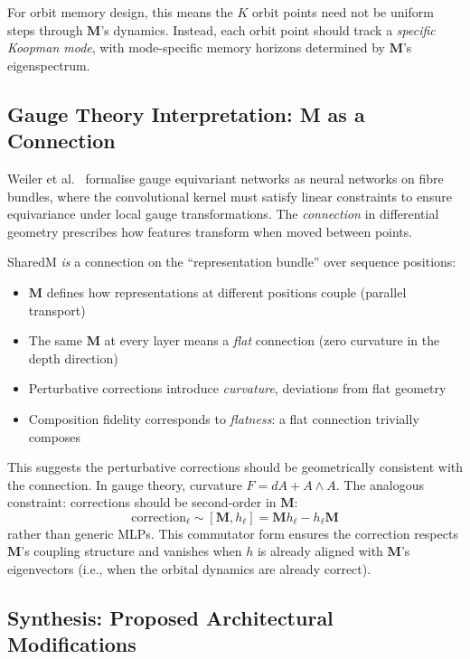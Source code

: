 \documentclass[11pt, a4paper]{article}
\newcommand{\M}{\mathbf{M}}
\theoremstyle{plain}
\theoremstyle{remark}
\begin{document}
For orbit memory design, this means the $K$ orbit points need not be uniform steps through $\M$'s dynamics.
Instead, each orbit point should track a \emph{specific Koopman mode}, with mode-specific memory horizons determined by $\M$'s eigenspectrum.

\subsection{Gauge Theory Interpretation: M as a Connection}

Weiler et al.~\cite{weiler2024gauge} formalise gauge equivariant networks as neural networks on fibre bundles, where the convolutional kernel must satisfy linear constraints to ensure equivariance under local gauge transformations.
The \emph{connection} in differential geometry prescribes how features transform when moved between points.

SharedM \emph{is} a connection on the ``representation bundle'' over sequence positions:
\begin{itemize}[nosep]
    \item $\M$ defines how representations at different positions couple (parallel transport)
    \item The same $\M$ at every layer means a \emph{flat} connection (zero curvature in the depth direction)
    \item Perturbative corrections introduce \emph{curvature}, deviations from flat geometry
    \item Composition fidelity corresponds to \emph{flatness}: a flat connection trivially composes
\end{itemize}

This suggests the perturbative corrections should be geometrically consistent with the connection.
In gauge theory, curvature $F = dA + A \wedge A$.
The analogous constraint: corrections should be second-order in $\M$:
\begin{equation}
    \text{correction}_\ell \sim [\M, h_\ell] = \M h_\ell - h_\ell \M
\end{equation}
rather than generic MLPs.
This commutator form ensures the correction respects $\M$'s coupling structure and vanishes when $h$ is already aligned with $\M$'s eigenvectors (i.e., when the orbital dynamics are already correct).

\subsection{Synthesis: Proposed Architectural Modifications}
\end{document}
